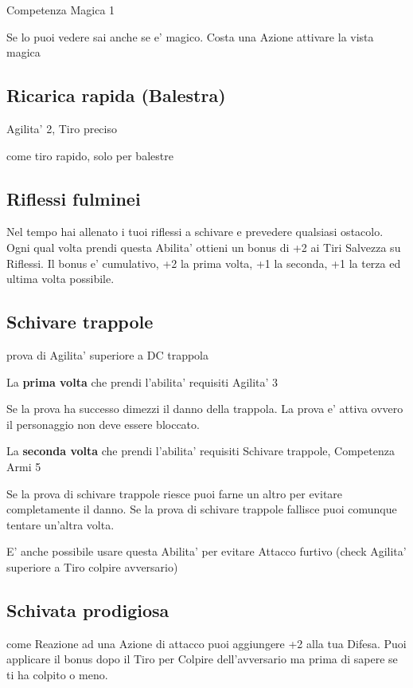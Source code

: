 \documentclass[a4paper,11pt,twoside,openany]{book}
\begin{document}
	Competenza Magica 1
	
	Se lo puoi vedere sai anche se e' magico. Costa una Azione attivare la vista magica
	
	\subsection{Ricarica rapida (Balestra)}
	
	Agilita' 2, Tiro preciso
	
	come tiro rapido, solo per balestre
	
	\subsection{Riflessi fulminei}
	
	Nel tempo hai allenato i tuoi riflessi a schivare e prevedere qualsiasi ostacolo. Ogni qual volta prendi questa Abilita' ottieni un bonus di +2 ai Tiri Salvezza su Riflessi. Il bonus e' cumulativo, +2 la prima volta, +1 la seconda, +1 la terza ed ultima volta possibile.
	
	\subsection{Schivare trappole}
	
	prova di Agilita' superiore a DC trappola
	
	La \textbf{prima volta} che prendi l'abilita' requisiti Agilita' 3
	
	Se la prova ha successo dimezzi il danno della trappola. La prova e' attiva ovvero il personaggio non deve essere bloccato.
	
	La \textbf{seconda volta} che prendi l'abilita' requisiti Schivare trappole, Competenza Armi 5
	
	Se la prova di schivare trappole riesce puoi farne un altro per evitare completamente il danno. Se la prova di schivare trappole fallisce puoi comunque tentare un'altra volta.
	
	E' anche possibile usare questa Abilita' per evitare Attacco furtivo (check Agilita' superiore a Tiro colpire avversario)
	
	\subsection{Schivata prodigiosa}
	
	come Reazione ad una Azione di attacco puoi aggiungere +2 alla tua Difesa. Puoi applicare il bonus dopo il Tiro per Colpire dell'avversario ma prima di sapere se ti ha colpito o meno.
	
\end{document}
